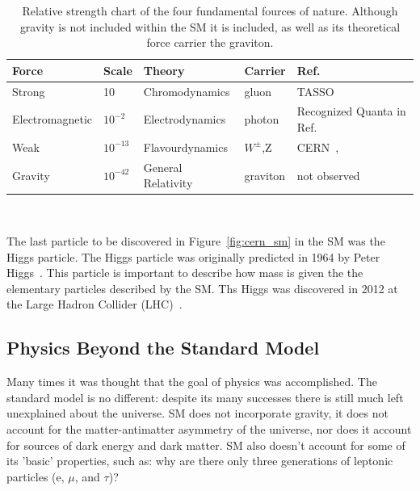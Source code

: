 \begin{table}
\begin{center}
\begin{tabular}{||p{30mm} p{20mm} p{40mm} p{25mm} p{35mm}||}
 \hline
 Force & Scale & Theory & Carrier & Ref. \\ [0.5ex]
 \hline\hline
 Strong & 10 & Chromodynamics & gluon & TASSO~\citep{tasso_1978_BRANDELIK1979243, PETRA_PhysRevLett.43.830} \\
 \hline
 Electromagnetic & $10^{-2} $ & Electrodynamics & photon & Recognized Quanta in Ref.~\citep{https://doi.org/10.1002/andp.19053220607} \\
 \hline
 Weak & $10^{-13}$ & Flavourdynamics & $W^{\pm}$,Z & CERN~\citep{wboson_measure_ARNISON1983103},\citep{zboson_measure_1983398}\\
 \hline
 Gravity & $10^{-42}$ & General Relativity & graviton  & not observed \\
 \hline
 \hline
\end{tabular}
\caption{Relative strength chart of the four fundamental fources of nature. 
Although gravity is not included within the SM it is included, as well as its theoretical force carrier the graviton.
}
\end{center}
\end{table}
~\label{table:forces}

The last particle to be discovered in Figure~\ref{fig:cern_sm} in the SM was the Higgs particle.
The Higgs particle was originally predicted in 1964 by Peter Higgs~\citep{HIGGS1964132}.
This particle is important to describe how mass is given the the elementary particles described by the SM.
Ths Higgs was discovered in 2012 at the Large Hadron Collider (LHC)~\citep{higgs_discovery_20121}.

\subsection{Physics Beyond the Standard Model}

Many times it was thought that the goal of physics was accomplished.
The standard model is no different: despite its many successes there is still much left unexplained about the universe.
SM does not incorporate gravity, it does not account for the matter-antimatter asymmetry of the universe, nor does it account for sources of dark energy and dark matter.
SM also doesn't account for some of its 'basic' properties, such as: why are there only three generations of leptonic particles (e, $\mu$, and $\tau$)?

